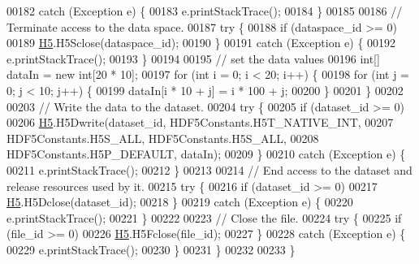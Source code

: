 \begin{DoxyCode}
00182         \textcolor{keywordflow}{catch} (Exception e) \{
00183             e.printStackTrace();
00184         \}
00185 
00186         \textcolor{comment}{// Terminate access to the data space.}
00187         \textcolor{keywordflow}{try} \{
00188             \textcolor{keywordflow}{if} (dataspace\_id >= 0)
00189                 \hyperlink{namespace_h5}{H5}.H5Sclose(dataspace\_id);
00190         \}
00191         \textcolor{keywordflow}{catch} (Exception e) \{
00192             e.printStackTrace();
00193         \}
00194 
00195         \textcolor{comment}{// set the data values}
00196         \textcolor{keywordtype}{int}[] dataIn = \textcolor{keyword}{new} \textcolor{keywordtype}{int}[20 * 10];
00197         \textcolor{keywordflow}{for} (\textcolor{keywordtype}{int} i = 0; i < 20; i++) \{
00198             \textcolor{keywordflow}{for} (\textcolor{keywordtype}{int} j = 0; j < 10; j++) \{
00199                 dataIn[i * 10 + j] = i * 100 + j;
00200             \}
00201         \}
00202 
00203         \textcolor{comment}{// Write the data to the dataset.}
00204         \textcolor{keywordflow}{try} \{
00205             \textcolor{keywordflow}{if} (dataset\_id >= 0)
00206                 \hyperlink{namespace_h5}{H5}.H5Dwrite(dataset\_id, HDF5Constants.H5T\_NATIVE\_INT,
00207                         HDF5Constants.H5S\_ALL, HDF5Constants.H5S\_ALL,
00208                         HDF5Constants.H5P\_DEFAULT, dataIn);
00209         \}
00210         \textcolor{keywordflow}{catch} (Exception e) \{
00211             e.printStackTrace();
00212         \}
00213 
00214         \textcolor{comment}{// End access to the dataset and release resources used by it.}
00215         \textcolor{keywordflow}{try} \{
00216             \textcolor{keywordflow}{if} (dataset\_id >= 0)
00217                 \hyperlink{namespace_h5}{H5}.H5Dclose(dataset\_id);
00218         \}
00219         \textcolor{keywordflow}{catch} (Exception e) \{
00220             e.printStackTrace();
00221         \}
00222 
00223         \textcolor{comment}{// Close the file.}
00224         \textcolor{keywordflow}{try} \{
00225             \textcolor{keywordflow}{if} (file\_id >= 0)
00226                 \hyperlink{namespace_h5}{H5}.H5Fclose(file\_id);
00227         \}
00228         \textcolor{keywordflow}{catch} (Exception e) \{
00229             e.printStackTrace();
00230         \}
00231     \}
00232 
00233 \}
\end{DoxyCode}
